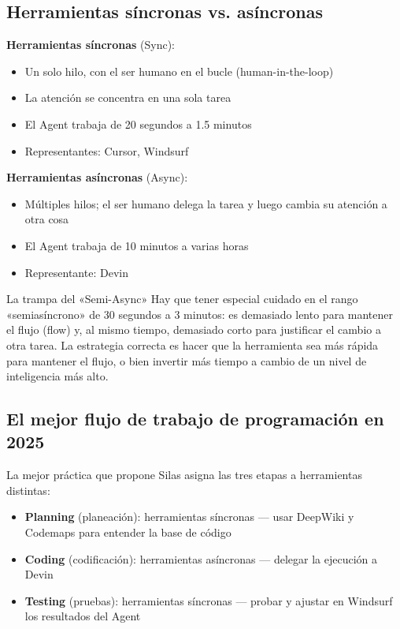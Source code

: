 \documentclass[a4paper]{article}
\begin{document}
\subsection{Herramientas síncronas vs. asíncronas}

\textbf{Herramientas síncronas} (Sync):
\begin{itemize}
    \item Un solo hilo, con el ser humano en el bucle (human-in-the-loop)
    \item La atención se concentra en una sola tarea
    \item El Agent trabaja de 20 segundos a 1.5 minutos
    \item Representantes: Cursor, Windsurf
\end{itemize}

\textbf{Herramientas asíncronas} (Async):
\begin{itemize}
    \item Múltiples hilos; el ser humano delega la tarea y luego cambia su atención a otra cosa
    \item El Agent trabaja de 10 minutos a varias horas
    \item Representante: Devin
\end{itemize}

\begin{warningbox}{La trampa del «Semi-Async»}
Hay que tener especial cuidado en el rango «semiasíncrono» de 30 segundos a 3 minutos: es demasiado lento para mantener el flujo (flow) y, al mismo tiempo, demasiado corto para justificar el cambio a otra tarea. La estrategia correcta es hacer que la herramienta sea más rápida para mantener el flujo, o bien invertir más tiempo a cambio de un nivel de inteligencia más alto.
\end{warningbox}

\subsection{El mejor flujo de trabajo de programación en 2025}

La mejor práctica que propone Silas asigna las tres etapas a herramientas distintas:

\begin{itemize}
    \item \textbf{Planning} (planeación): herramientas síncronas — usar DeepWiki y Codemaps para entender la base de código
    \item \textbf{Coding} (codificación): herramientas asíncronas — delegar la ejecución a Devin
    \item \textbf{Testing} (pruebas): herramientas síncronas — probar y ajustar en Windsurf los resultados del Agent
\end{itemize}
\end{document}
